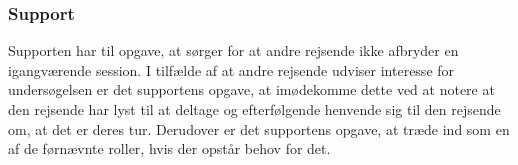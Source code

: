 \subsubsection*{Support}
Supporten har til opgave, at sørger for at andre rejsende ikke afbryder en igangværende session. I tilfælde af at andre rejsende udviser interesse for undersøgelsen er det supportens opgave, at imødekomme dette ved at notere at den rejsende har lyst til at deltage og efterfølgende henvende sig til den rejsende om, at det er deres tur. Derudover er det supportens opgave, at træde ind som en af de førnævnte roller, hvis der opstår behov for det.  



